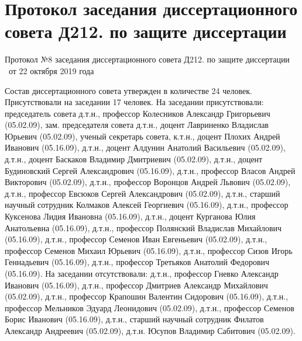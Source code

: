 
\section{Протокол заседания диссертационного совета Д212. по защите диссертации}

Протокол №8
заседания диссертационного совета Д212. по защите диссертации
\thesisAuthorLastNameFromFull\
от 22 октября 2019 года

Состав диссертационного совета утвержден в количестве 24 человек.
Присутствовали на заседании 17 человек.
На заседании присутствовали: председатель совета д.т.н., профессор Колесников Александр Григорьевич (05.02.09), зам. председателя совета д.т.н., доцент Лавриненко Владислав Юрьевич (05.02.09), ученый секретарь совета, к.т.н., доцент Плохих Андрей Иванович (05.16.09), д.т.н., доцент Алдунин Анатолий Васильевич (05.02.09), д.т.н., доцент Баскаков Владимир Дмитриевич (05.02.09), д.т.н., доцент Будиновский Сергей Александрович (05.16.09), д.т.н., профессор Власов Андрей Викторович (05.02.09), д.т.н., профессор Воронцов Андрей Львович (05.02.09), д.т.н., профессор Евсюков Сергей Александрович (05.02.09), д.т.н., старший научный сотрудник Колмаков Алексей Георгиевич (05.16.09), д.т.н., профессор Куксенова Лидия Ивановна (05.16.09), д.т.н., доцент Курганова Юлия Анатольевна (05.16.09), д.т.н., профессор Полянский Владислав Михайлович (05.16.09), д.т.н., профессор Семенов Иван Евгеньевич (05.02.09), д.т.н., профессор Семенов Михаил Юрьевич (05.16.09), д.т.н., профессор Сизов Игорь Геннадьевич (05.16.09), д.т.н., профессор Третьяков Анатолий Федорович (05.16.09).
На заседании отсутствовали: д.т.н., профессор Гневко Александр Иванович (05.16.09), д.т.н., профессор Дмитриев Александр Михайлович (05.02.09), д.т.н., профессор Крапошин Валентин Сидорович (05.16.09), д.т.н., профессор Мельников Эдуард Леонидович (05.02.09), д.т.н., профессор Семенов Борис Иванович (05.16.09), д.т.н., старший научный сотрудник Филатов Александр Андреевич (05.02.09), д.т.н. Юсупов Владимир Сабитович (05.02.09).

